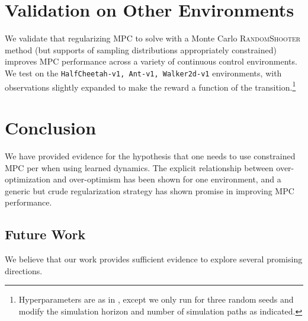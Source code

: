 \documentclass{article}
\let\Oldsection\section
\renewcommand{\section}{\FloatBarrier\Oldsection}
\let\Oldsubsection\subsection
\renewcommand{\subsection}{\FloatBarrier\Oldsubsection}
\begin{document}
\section{Validation on Other Environments}

We validate that regularizing MPC to solve  with a Monte Carlo \textsc{RandomShooter} method (but supports of sampling distributions appropriately constrained) improves MPC performance across a variety of continuous control environments. We test on the \texttt{HalfCheetah-v1, Ant-v1, Walker2d-v1} environments, with observations slightly expanded to make the reward a function of the transition.\footnote{Hyperparameters are as in , except we only run for three random seeds and modify the simulation horizon and number of simulation paths as indicated.}


\section{Conclusion}

We have provided evidence for the hypothesis that one needs to use constrained MPC per  when using learned dynamics. The explicit relationship between over-optimization and over-optimism has been shown for one environment, and a generic but crude regularization strategy has shown promise in improving MPC performance.

\subsection{Future Work}

We believe that our work provides sufficient evidence to explore several promising directions.
\end{document}
